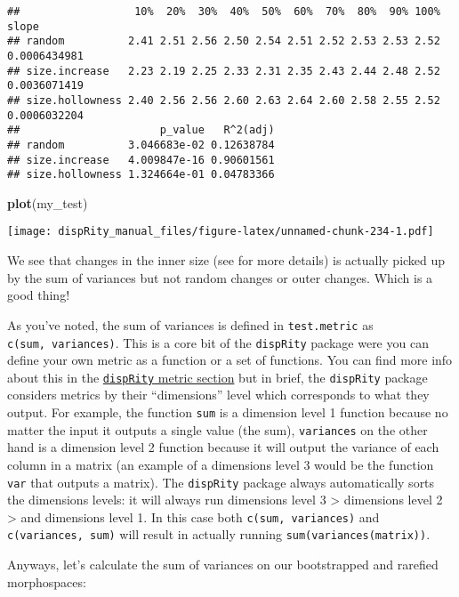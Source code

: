 \documentclass[
]{book}
\newenvironment{Shaded}{\begin{snugshade}}{\end{snugshade}}
\newcommand{\KeywordTok}[1]{\textcolor[rgb]{0.13,0.29,0.53}{\textbf{#1}}}
\newcommand{\NormalTok}[1]{#1}
\begin{document}
\begin{verbatim}
##                  10%  20%  30%  40%  50%  60%  70%  80%  90% 100%        slope
## random          2.41 2.51 2.56 2.50 2.54 2.51 2.52 2.53 2.53 2.52 0.0006434981
## size.increase   2.23 2.19 2.25 2.33 2.31 2.35 2.43 2.44 2.48 2.52 0.0036071419
## size.hollowness 2.40 2.56 2.56 2.60 2.63 2.64 2.60 2.58 2.55 2.52 0.0006032204
##                      p_value   R^2(adj)
## random          3.046683e-02 0.12638784
## size.increase   4.009847e-16 0.90601561
## size.hollowness 1.324664e-01 0.04783366
\end{verbatim}

\begin{Shaded}
\begin{Highlighting}[]
\KeywordTok{plot}\NormalTok{(my\_test)}
\end{Highlighting}
\end{Shaded}

\texttt{[image: dispRity\_manual\_files/figure-latex/unnamed-chunk-234-1.pdf]}

We see that changes in the inner size (see \citet{moms} for more details) is actually picked up by the sum of variances but not random changes or outer changes. Which is a good thing!

As you've noted, the sum of variances is defined in \texttt{test.metric} as \texttt{c(sum,\ variances)}. This is a core bit of the \texttt{dispRity} package were you can define your own metric as a function or a set of functions.
You can find more info about this in the \protect\hyperlink{disparity-metrics}{\texttt{dispRity} metric section} but in brief, the \texttt{dispRity} package considers metrics by their ``dimensions'' level which corresponds to what they output. For example, the function \texttt{sum} is a dimension level 1 function because no matter the input it outputs a single value (the sum), \texttt{variances} on the other hand is a dimension level 2 function because it will output the variance of each column in a matrix (an example of a dimensions level 3 would be the function \texttt{var} that outputs a matrix).
The \texttt{dispRity} package always automatically sorts the dimensions levels: it will always run dimensions level 3 \textgreater{} dimensions level 2 \textgreater{} and dimensions level 1. In this case both \texttt{c(sum,\ variances)} and \texttt{c(variances,\ sum)} will result in actually running \texttt{sum(variances(matrix))}.

Anyways, let's calculate the sum of variances on our bootstrapped and rarefied morphospaces:
\end{document}
